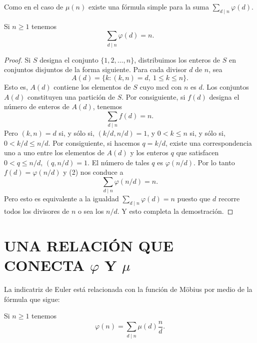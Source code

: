 \documentclass[12pt,a4paper]{book}
\begin{document}
    Como en el caso de $\mu(n)$ existe una fórmula simple para la suma
    $\sum_{d\mid n}\varphi(d)$.

    \begin{teorema}
        Si $n\geq1$ tenemos
        \begin{equation*}
            \sum_{d\mid n}\varphi(d)=n.
        \end{equation*}
    \end{teorema}

    \begin{proof}
        Si $S$ designa el conjunto $\{1,2,\dots,n\}$, distribuimos los enteros de $S$ en
        conjuntos disjuntos de la forma siguiente. Para cada divisor $d$ de $n$, sea
        \begin{equation*}
            A(d)=\{k:(k,n)=d,\ 1\leq k\leq n\}.
        \end{equation*}
        Esto es, $A(d)$ contiene los elementos de $S$ cuyo mcd con $n$ es $d$. Los conjuntos
        $A(d)$ constituyen una partición de $S$. Por consiguiente, si $f(d)$ designa el
        número de enteros de $A(d)$, tenemos
        \begin{equation}
            \sum_{d\mid n}f(d)=n.
        \end{equation}
        Pero $(k,n)=d$ si, y sólo si, $(k/d,n/d)=1$, y $0<k\leq n$ si, y sólo si,
        $0<k/d\leq n/d$. Por consiguiente, si hacemos $q=k/d$, existe una correspondencia
        uno a uno entre los elementos de $A(d)$ y los enteros $q$ que satisfacen
        $0<q\leq n/d$, $(q,n/d)=1$. El número de tales $q$ es $\varphi(n/d)$. Por lo tanto
        $f(d)=\varphi(n/d)$ y (2) nos conduce a
        \begin{equation*}
            \sum_{d\mid n}\varphi(n/d)=n.
        \end{equation*}
        Pero esto es equivalente a la igualdad $\sum_{d\mid n}\varphi(d)=n$ puesto que $d$
        recorre todos los divisores de $n$ o sea los $n/d$. Y esto completa la demostración.
    \end{proof}

    \section{UNA RELACIÓN QUE CONECTA \texorpdfstring{$\varphi$}{φ} Y \texorpdfstring{$\mu$}{μ}}

    La indicatriz de Euler está relacionada con la función de Möbius por medio de la
    fórmula que sigue:

    \begin{teorema}
        Si $n\geq1$ tenemos
        \begin{equation*}
            \varphi(n)=\sum_{d\mid n}\mu(d)\frac{n}{d}.
        \end{equation*}
    \end{teorema}
\end{document}
